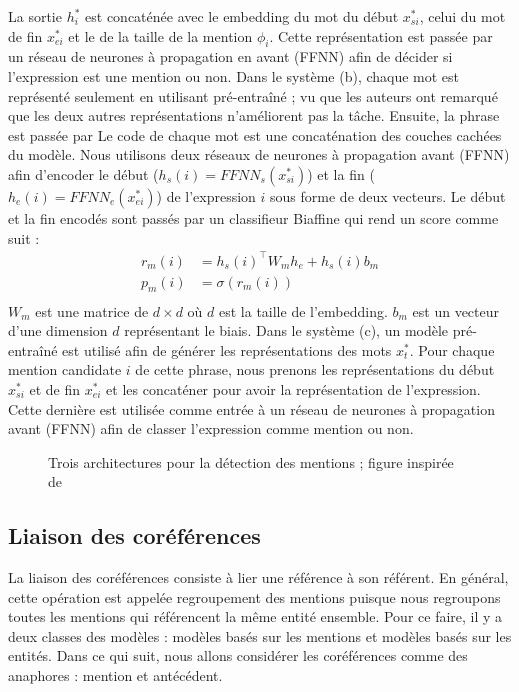 \documentclass{KodeBook}
\begin{document}
La sortie $h^*_i$ est concaténée avec le embedding du mot du début $x^*_{si}$, celui du mot de fin $x^*_{ei}$ et le  de la taille de la mention $\phi_i$.
Cette représentation est passée par un réseau de neurones à propagation en avant (FFNN) afin de décider si l'expression est une mention ou non.
Dans le système (b), chaque mot est représenté seulement en utilisant  pré-entraîné ; vu que les auteurs ont remarqué que les deux autres représentations n'améliorent pas la tâche.
Ensuite, la phrase est passée par 
Le code de chaque mot est une concaténation des couches cachées du modèle.
Nous utilisons deux réseaux de neurones à propagation avant (FFNN) afin d'encoder le début ($ h_s(i) = FFNN_s(x_{si}^*)$) et la fin ($ h_e(i) = FFNN_e(x_{ei}^*)$) de l'expression $i$ sous forme de deux vecteurs. 
Le début et la fin encodés sont passés par un classifieur Biaffine \cite{2017-dozat-manning} qui rend un score comme suit : 
\begin{align*}
r_m(i) & = h_s(i)^\top W_m h_e + h_s(i) b_m \\
p_m(i) & = \sigma(r_m(i)) \\
\end{align*}
$W_m$ est une matrice de $d\times d$ où $d$ est la taille de l'embedding.
$b_m$ est un vecteur d'une dimension $d$ représentant le biais.
Dans le système (c), un modèle  pré-entraîné est utilisé afin de générer les représentations des mots $x^*_t$. 
Pour chaque mention candidate $i$ de cette phrase, nous prenons les représentations du début $x^*_{si}$ et de fin $x^*_{ei}$ et les concaténer pour avoir la représentation de l'expression. 
Cette dernière est utilisée comme entrée à un réseau de neurones à propagation avant (FFNN) afin de classer l'expression comme mention ou non. 

\begin{figure}[ht]
	\centering
	\caption[Trois architectures pour la détection des mentions]{Trois architectures pour la détection des mentions ; figure inspirée de \cite{2020-yu-al}}
	\label{fig:det-mention-yu}
\end{figure}

\subsection{Liaison des coréférences}

La liaison des coréférences consiste à lier une référence à son référent. 
En général, cette opération est appelée regroupement des mentions puisque nous regroupons toutes les mentions qui référencent la même entité ensemble. 
Pour ce faire, il y a deux classes des modèles : modèles basés sur les mentions et modèles basés sur les entités. 
Dans ce qui suit, nous allons considérer les coréférences comme des anaphores : mention et antécédent.
\end{document}

